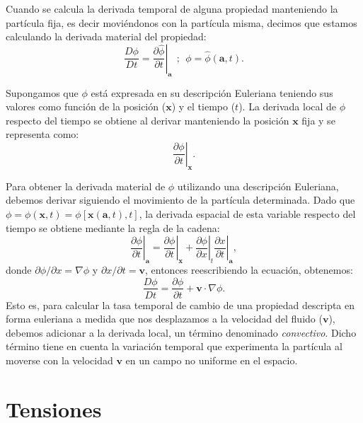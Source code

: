 \documentclass[a4paper,10pt, oneside]{book}
\begin{document}
Cuando se calcula la derivada temporal de alguna propiedad manteniendo la partícula fija, es decir moviéndonos con la partícula misma, decimos que estamos calculando la derivada material del propiedad:
\begin{equation}
	\frac{D \phi}{D t} = \left. \frac{\partial \widehat{\phi}}{\partial t} \right\vert_{\mathbf{a}} ~~;~~ \phi = \widehat{\phi}(\mathbf{a},t). \nonumber
\end{equation}

Supongamos que $\phi$ está expresada en su descripción Euleriana teniendo sus valores como función de la posición ($\mathbf{x}$) y el tiempo ($t$). La derivada local de $\phi$ respecto del tiempo se obtiene al derivar manteniendo la posición $\mathbf{x}$ fija y se representa como:
\begin{equation}
	\left. \frac{\partial \phi}{\partial t} \right\vert_{\mathbf{x}}. \nonumber
\end{equation}

Para obtener la derivada material de $\phi$ utilizando una descripción Euleriana, debemos derivar siguiendo el movimiento de la partícula determinada. Dado que $\phi = \phi(\mathbf{x},t) = \phi [\mathbf{x}(\mathbf{a},t),t]$, la derivada espacial de esta variable respecto del tiempo se obtiene mediante la regla de la cadena:
\begin{equation}
	\left. \frac{\partial \phi}{\partial t} \right\vert_\mathbf{a} = \left. \frac{\partial \phi}{\partial t} \right\vert_\mathbf{x} + \left. \frac{\partial \phi}{\partial x} \right\vert_t \left. \frac{\partial x}{\partial t} \right\vert_\mathbf{a}, \nonumber 
\end{equation}
donde $\partial \phi / \partial x = \nabla \phi$ y $\partial x /\partial t = \mathbf{v}$, entonces reescribiendo la ecuación, obtenemos:
\begin{equation}
	\frac{D\phi}{Dt} = \frac{\partial \phi}{\partial t} + \mathbf{v} \cdot \nabla \phi.
	\label{eq:2-2}
\end{equation}
Esto es, para calcular la tasa temporal de cambio de una propiedad descripta en forma euleriana a medida que nos desplazamos a la velocidad del fluido ($\mathbf{v}$), debemos adicionar a la derivada local, un término denominado \textit{convectivo}. Dicho término tiene en cuenta la variación temporal que experimenta la partícula al moverse con la velocidad $\mathbf{v}$ en un campo no uniforme en el espacio.

\section{Tensiones}
\end{document}
